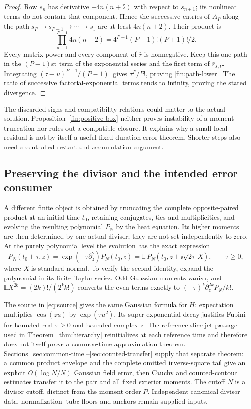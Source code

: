 \begin{proof}
Row $s_n$ has derivative $-4n(n+2)$ with respect to $s_{n+1}$;
its nonlinear terms do not contain that component. Hence the
successive entries of $A_P$ along the path
$s_P\to s_{P-1}\to\cdots\to s_1$ are at least $4n(n+2)$.
Their product is
\[
 \prod_{n=1}^{P-1}4n(n+2)
       =4^{P-1}(P-1)!(P+1)!/2.
\]
Every matrix power and every component of $\bar r$ is nonnegative.
Keep this one path in the $(P-1)$st term of the exponential series
and the first term of $\bar r_{s,P}$. Integrating
$(\tau-u)^{P-1}/(P-1)!$ gives $\tau^P/P!$, proving
\eqref{fin:path-lower}. The ratio of successive factorial-exponential
terms tends to infinity, proving the stated divergence.
\end{proof}

The discarded signs and compatibility relations could matter to the
actual solution. Proposition~\ref{fin:positive-box} neither proves
instability of a moment truncation nor rules out a compatible closure.
It explains why a small local residual is not by itself a useful
fixed-duration error theorem. Shorter steps also need a controlled
restart and accumulation argument.

\subsection{Preserving the divisor and the intended error consumer}

A different finite object is obtained by truncating the complete
opposite-paired product at an initial time $t_0$, retaining conjugates,
ties and multiplicities, and evolving the resulting polynomial $P_N$
by the heat equation. Its higher moments are then determined by one
actual divisor; they are not set independently to zero. At the purely
polynomial level the evolution has the exact expression
\begin{equation}
 P_N(t_0+\tau,z)
 =\exp(-\tau\partial_z^2)P_N(t_0,z)
 =\mathbb E\,P_N(t_0,z+\ii\sqrt{2\tau}\,X),\qquad \tau\ge0,
 \label{fin:polynomial-heat}
\end{equation}
where $X$ is standard normal. To verify the second identity, expand the
polynomial in its finite Taylor series. Odd Gaussian moments vanish,
and $\mathbb EX^{2k}=(2k)!/(2^kk!)$ converts the even terms exactly
to $(-\tau)^k\partial_z^{2k}P_N/k!$.

The source in \eqref{eq:source} gives the same Gaussian formula for $H$:
expectation multiplies $\cos(zu)$ by $\exp(\tau u^2)$. Its
super-exponential decay justifies Fubini for bounded real $\tau\ge0$
and bounded complex $z$. The reference-slice jet passage used in
Theorem~\ref{thm:hierarchy} reinitializes at each reference time and
therefore does not itself prove a common-time approximation theorem.
Sections~\ref{sec:common-time}--\ref{sec:counted-transfer} supply that
separate theorem: a common product envelope and the complete omitted
inverse-square tail give an explicit $O(\log N/N)$ Gaussian field error,
then Cauchy and counted-contour estimates transfer it to the pair and
all fixed exterior moments. The cutoff $N$ is a divisor cutoff,
distinct from the moment order $P$. Independent canonical divisor data,
normalization, tube floors and anchors remain supplied inputs.

